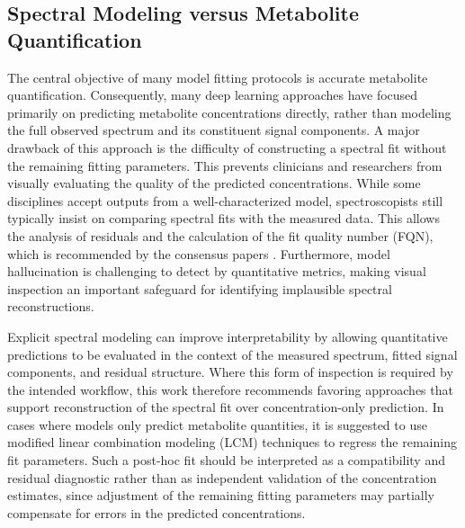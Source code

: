 \subsection{Spectral Modeling versus Metabolite Quantification}
The central objective of many model fitting protocols is accurate metabolite quantification. Consequently, many deep learning approaches have focused primarily on predicting metabolite concentrations directly, rather than modeling the full observed spectrum and its constituent signal components. A major drawback of this approach is the difficulty of constructing a spectral fit without the remaining fitting parameters. This prevents clinicians and researchers from visually evaluating the quality of the predicted concentrations. While some disciplines accept outputs from a well-characterized model, spectroscopists still typically insist on comparing spectral fits with the measured data. This allows the analysis of residuals and the calculation of the fit quality number (FQN), which is recommended by the consensus papers \cite{Near2021}. Furthermore, model hallucination is challenging to detect by quantitative metrics, making visual inspection an important safeguard for identifying implausible spectral reconstructions. 

Explicit spectral modeling can improve interpretability by allowing quantitative predictions to be evaluated in the context of the measured spectrum, fitted signal components, and residual structure. Where this form of inspection is required by the intended workflow, this work therefore recommends favoring \DL approaches that support reconstruction of the spectral fit over concentration-only prediction. In cases where models only predict metabolite quantities, it is suggested to use modified linear combination modeling (LCM) techniques to regress the remaining fit parameters. Such a post-hoc fit should be interpreted as a compatibility and residual diagnostic rather than as independent validation of the \DL concentration estimates, since adjustment of the remaining fitting parameters may partially compensate for errors in the predicted concentrations.

